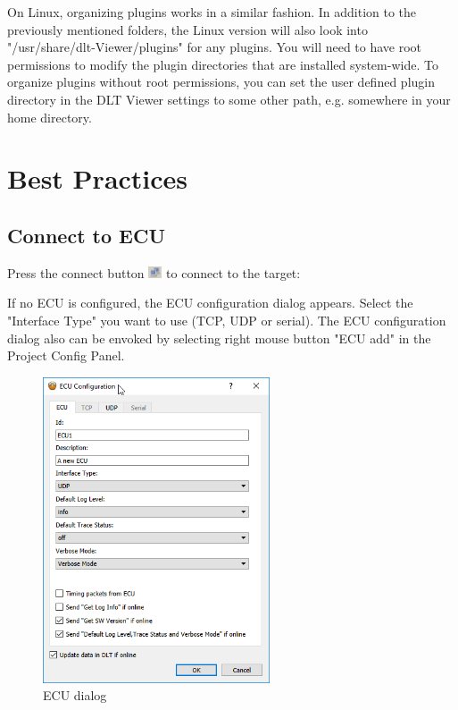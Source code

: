 \documentclass[a4paper,11pt]{article}
\begin{document}
On Linux, organizing plugins works in a similar fashion. In addition to the previously mentioned folders,
the Linux version will also look into "/usr/share/dlt-Viewer/plugins" for any plugins.
You will need to have root permissions to modify the plugin directories that are installed system-wide.
To organize plugins without root permissions, you can set the user defined plugin directory in the DLT Viewer
settings to some other path, e.g. somewhere in your home directory.



\section{Best Practices}

\subsection{Connect to ECU}
\label{connecttoecu}

Press the connect button \includegraphics[width=0.03\textwidth]{images/connect_button.png} to connect to the target:\linebreak

If no ECU is configured, the ECU configuration dialog appears.
Select the "Interface Type" you want to use (TCP, UDP or serial).
The ECU configuration dialog also can be envoked by selecting right mouse button "ECU add"
in the Project Config Panel.

\begin{figure}[H]
 \centering
 \includegraphics[width=0.6\textwidth]{images/ECU_dialog.png}
 \caption{ECU dialog}
 \label{fig:ecudialog}
\end{figure}
\end{document}
